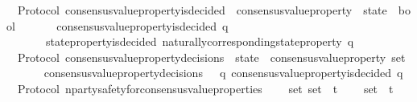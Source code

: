\begin{isabellebody}
{\isafoldproof}%
%
\isadelimproof
\isanewline
%
\endisadelimproof
\isanewline
\isanewline
{}\isamarkupfalse%
\ {\isacharparenleft}\ Protocol{\isacharparenright}\ consensus{\isacharunderscore}value{\isacharunderscore}property{\isacharunderscore}is{\isacharunderscore}decided\ {\isacharcolon}{\isacharcolon}\ {\isachardoublequoteopen}{\isacharparenleft}consensus{\isacharunderscore}value{\isacharunderscore}property\ {\isacharasterisk}\ state{\isacharparenright}\ {\isasymRightarrow}\ bool{\isachardoublequoteclose}\isanewline
\ \ \isanewline
\ \ \ \ {\isachardoublequoteopen}consensus{\isacharunderscore}value{\isacharunderscore}property{\isacharunderscore}is{\isacharunderscore}decided\ {\isacharparenleft}q{\isacharcomma}\ {\isasymsigma}{\isacharparenright}\isanewline
\ \ \ \ \ \ {\isacharequal}\ state{\isacharunderscore}property{\isacharunderscore}is{\isacharunderscore}decided\ {\isacharparenleft}naturally{\isacharunderscore}corresponding{\isacharunderscore}state{\isacharunderscore}property\ q{\isacharcomma}\ {\isasymsigma}{\isacharparenright}{\isachardoublequoteclose}\isanewline
\isanewline
\isanewline
{}\isamarkupfalse%
\ {\isacharparenleft}\ Protocol{\isacharparenright}\ consensus{\isacharunderscore}value{\isacharunderscore}property{\isacharunderscore}decisions\ {\isacharcolon}{\isacharcolon}\ {\isachardoublequoteopen}state\ {\isasymRightarrow}\ consensus{\isacharunderscore}value{\isacharunderscore}property\ set{\isachardoublequoteclose}\isanewline
\ \ \isanewline
\ \ \ \ {\isachardoublequoteopen}consensus{\isacharunderscore}value{\isacharunderscore}property{\isacharunderscore}decisions\ {\isasymsigma}\ {\isacharequal}\ {\isacharbraceleft}q{\isachardot}\ consensus{\isacharunderscore}value{\isacharunderscore}property{\isacharunderscore}is{\isacharunderscore}decided\ {\isacharparenleft}q{\isacharcomma}\ {\isasymsigma}{\isacharparenright}{\isacharbraceright}{\isachardoublequoteclose}\isanewline
\isanewline
\isanewline
{}\isamarkupfalse%
\ {\isacharparenleft}\ Protocol{\isacharparenright}\ n{\isacharunderscore}party{\isacharunderscore}safety{\isacharunderscore}for{\isacharunderscore}consensus{\isacharunderscore}value{\isacharunderscore}properties\ {\isacharcolon}\isanewline
\ \ {\isachardoublequoteopen}{\isasymforall}\ {\isasymsigma}{\isacharunderscore}set{\isachardot}\ {\isasymsigma}{\isacharunderscore}set\ {\isasymsubseteq}\ {\isasymSigma}t\isanewline
\ \ {\isasymlongrightarrow}\ {\isasymUnion}\ {\isasymsigma}{\isacharunderscore}set\ {\isasymin}\ {\isasymSigma}t\isanewline

\end{isabellebody}
